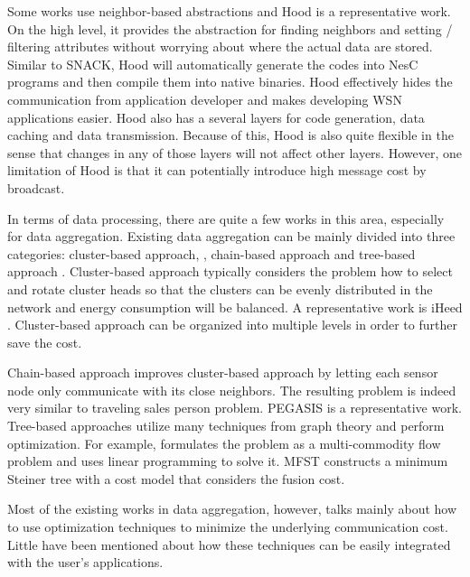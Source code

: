 Some works use neighbor-based abstractions and Hood \cite{hood} is a representative work. On the high level, it provides the abstraction for finding neighbors and setting / filtering attributes without worrying about where the actual data are stored. Similar to SNACK, Hood will automatically generate the codes into NesC programs and then compile them into native binaries. Hood effectively hides the communication from application developer and makes developing WSN applications easier. Hood also has a several layers for code generation, data caching and data transmission. Because of this, Hood is also quite flexible in the sense that changes in any of those layers will not affect other layers. However, one limitation of Hood is that it can potentially introduce high message cost by broadcast.

In terms of data processing, there are quite a few works in this area, especially for data aggregation. Existing data aggregation can be mainly divided into three categories: cluster-based approach, \cite{leach, iheed}, chain-based approach \cite{pegasis} and tree-based approach \cite{mfst, dctc}. Cluster-based approach typically considers the problem how to select and rotate cluster heads so that the clusters can be evenly distributed in the network  and energy consumption will be balanced. A representative work is iHeed \cite{iheed}. Cluster-based approach can be organized into multiple levels in order to further save the cost.

Chain-based approach improves cluster-based approach by letting each sensor node only communicate with its close neighbors. The resulting problem is indeed very similar to traveling sales person problem. PEGASIS \cite{pegasis} is a representative work. Tree-based approaches utilize many techniques from graph theory and perform optimization. For example, \cite{xue:lp} formulates the problem as a multi-commodity flow problem and uses linear programming to solve it.  MFST \cite{mfst} constructs a minimum Steiner tree with a cost model that considers the fusion cost.

Most of the existing works in data aggregation, however, talks mainly about how to use optimization techniques to minimize the underlying communication cost. Little have been mentioned about how these techniques can be easily integrated with the user's applications.